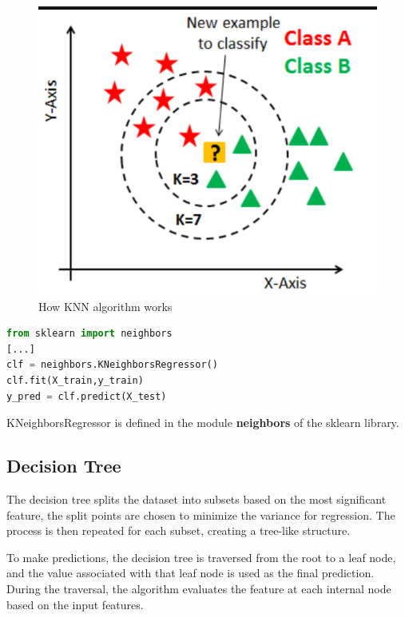 \begin{figure}
    \centering
    \includegraphics[scale=0.6]{res/ML/knn.png}
    \caption{How KNN algorithm works}
\end{figure}

\begin{lstlisting}[language=Python, caption=K Nearest Neighbors implementation]
from sklearn import neighbors
[...]
clf = neighbors.KNeighborsRegressor()
clf.fit(X_train,y_train)
y_pred = clf.predict(X_test)
\end{lstlisting}

KNeighborsRegressor is defined in the module \textbf{neighbors} of the sklearn library.

\subsection{Decision Tree}
The decision tree splits the dataset into subsets based on the most significant feature, the split points are chosen to minimize the variance for regression. The process is then repeated for each subset, creating a tree-like structure.

To make predictions, the decision tree is traversed from the root to a leaf node, and the value associated with that leaf node is used as the final prediction. During the traversal, the algorithm evaluates the feature at each internal node based on the input features.

